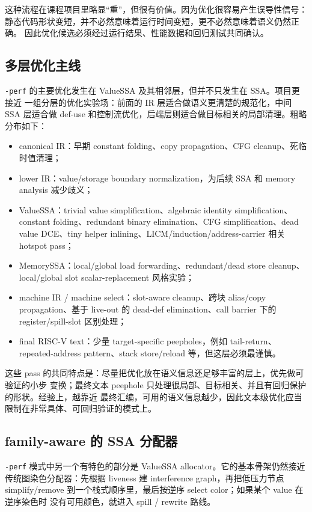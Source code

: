 \documentclass[UTF8,a4paper,11pt]{ctexart}
\begin{document}
这种流程在课程项目里略显“重”，但很有价值。因为优化很容易产生误导性信号：
静态代码形状变短，并不必然意味着运行时间变短，更不必然意味着语义仍然正确。
因此优化候选必须经过运行结果、性能数据和回归测试共同确认。

\subsection{多层优化主线}

\texttt{-perf} 的主要优化发生在 ValueSSA 及其相邻层，但并不只发生在 SSA。项目更接近
一组分层的优化实验场：前面的 IR 层适合做语义更清楚的规范化，中间 SSA 层适合做
def-use 和控制流优化，后端层则适合做目标相关的局部清理。粗略分布如下：

\begin{itemize}
  \item canonical IR：早期 constant folding、copy propagation、CFG cleanup、死临时值清理；
  \item lower IR：value/storage boundary normalization，为后续 SSA 和 memory analysis 减少歧义；
  \item ValueSSA：trivial value simplification、algebraic identity simplification、constant folding、redundant binary elimination、CFG simplification、dead value DCE、tiny helper inlining、LICM/induction/address-carrier 相关 hotspot pass；
  \item MemorySSA：local/global load forwarding、redundant/dead store cleanup、local/global slot scalar-replacement 风格实验；
  \item machine IR / machine select：slot-aware cleanup、跨块 alias/copy propagation、基于 live-out 的 dead-def elimination、call barrier 下的 register/spill-slot 区别处理；
  \item final RISC-V text：少量 target-specific peepholes，例如 tail-return、repeated-address pattern、stack store/reload 等，但这层必须最谨慎。
\end{itemize}

这些 pass 的共同特点是：尽量把优化放在语义信息还足够丰富的层上，优先做可验证的小步
变换；最终文本 peephole 只处理很局部、目标相关、并且有回归保护的形状。经验上，越靠近
最终汇编，可用的语义信息越少，因此文本级优化应当限制在非常具体、可回归验证的模式上。

\subsection{family-aware 的 SSA 分配器}

\texttt{-perf} 模式中另一个有特色的部分是 ValueSSA allocator。它的基本骨架仍然接近
传统图染色分配器：先根据 liveness 建 interference graph，再把低压力节点
simplify/remove 到一个栈式顺序里，最后按逆序 select color；如果某个 value 在逆序染色时
没有可用颜色，就进入 spill / rewrite 路线。
\end{document}
